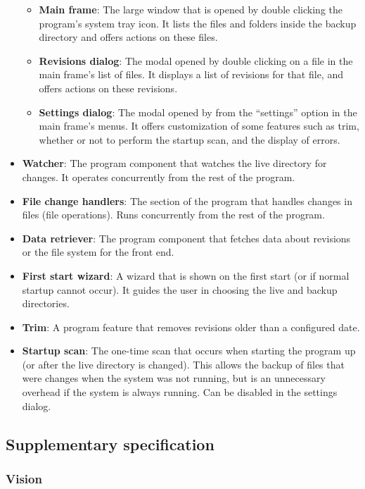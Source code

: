 \documentclass[12pt,a4paper]{article}
\newcommand\todonote[1]{{\color{red}\fbox{\parbox{\dimexpr\linewidth-2\fboxsep-2\fboxrule}{\textit\large{\textbf{TODO: #1}}}}}}
\begin{document}
\begin{itemize}
\begin{itemize}
	\item \textbf{Main frame}: The large window that is opened by double clicking the program's system tray icon. It lists the files and folders inside the backup directory and offers actions on these files.
	\item \textbf{Revisions dialog}: The modal opened by double clicking on a file in the main frame's list of files. It displays a list of revisions for that file, and offers actions on these revisions.
	\item \textbf{Settings dialog}: The modal opened by from the ``settings'' option in the main frame's menus. It offers customization of some features such as trim, whether or not to perform the startup scan, and the display of errors.
	\end{itemize}
\item \textbf{Watcher}: The program component that watches the live directory for changes. It operates concurrently from the rest of the program.
\item \textbf{File change handlers}: The section of the program that handles changes in files (file operations). Runs concurrently from the rest of the program.
\item \textbf{Data retriever}: The program component that fetches data about revisions or the file system for the front end.
\item \textbf{First start wizard}: A wizard that is shown on the first start (or if normal startup cannot occur). It guides the user in choosing the live and backup directories.
\item \textbf{Trim}: A program feature that removes revisions older than a configured date.
\item \textbf{Startup scan}: The one-time scan that occurs when starting the program up (or after the live directory is changed). This allows the backup of files that were changes when the system was not running, but is an unnecessary overhead if the system is always running. Can be disabled in the settings dialog.
\end{itemize}

\subsection{Supplementary specification}
\subsubsection{Vision}
\todonote{Butler. Adapt from M4.}
\end{document}
